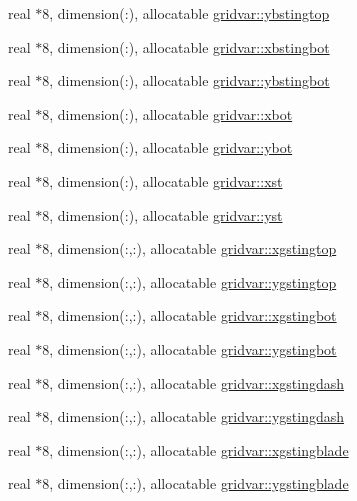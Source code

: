 \begin{DoxyCompactItemize}
\item 
real $\ast$8, dimension(\+:), allocatable \hyperlink{namespacegridvar_a0639e46ae56097b6f054ec6ec8fa5929}{gridvar\+::ybstingtop}
\item 
real $\ast$8, dimension(\+:), allocatable \hyperlink{namespacegridvar_a7b37df25204691373d89716e5f39a528}{gridvar\+::xbstingbot}
\item 
real $\ast$8, dimension(\+:), allocatable \hyperlink{namespacegridvar_a3f89618ccfbc9f5f8b2fef3e844fde54}{gridvar\+::ybstingbot}
\item 
real $\ast$8, dimension(\+:), allocatable \hyperlink{namespacegridvar_abda87534e29c12083ccea2d949c300e9}{gridvar\+::xbot}
\item 
real $\ast$8, dimension(\+:), allocatable \hyperlink{namespacegridvar_ad952a63f5ae1d8ed5480c9670ac9ecff}{gridvar\+::ybot}
\item 
real $\ast$8, dimension(\+:), allocatable \hyperlink{namespacegridvar_a2f9709ea33206d334446b47b7e2ca726}{gridvar\+::xst}
\item 
real $\ast$8, dimension(\+:), allocatable \hyperlink{namespacegridvar_addb37740c3b5b897fb0e5a34bfbcf08c}{gridvar\+::yst}
\item 
real $\ast$8, dimension(\+:,\+:), allocatable \hyperlink{namespacegridvar_a13592c5c62fa4125e18fa8df3f64a43b}{gridvar\+::xgstingtop}
\item 
real $\ast$8, dimension(\+:,\+:), allocatable \hyperlink{namespacegridvar_a7ca6b72f5d1eb6a91685b56d93b936c6}{gridvar\+::ygstingtop}
\item 
real $\ast$8, dimension(\+:,\+:), allocatable \hyperlink{namespacegridvar_a280b9f2c74950beb202cb0aae123fb8a}{gridvar\+::xgstingbot}
\item 
real $\ast$8, dimension(\+:,\+:), allocatable \hyperlink{namespacegridvar_a819dd42b0469aff2373b237be7d72b84}{gridvar\+::ygstingbot}
\item 
real $\ast$8, dimension(\+:,\+:), allocatable \hyperlink{namespacegridvar_a995496c4b06b80179c34232029a8c471}{gridvar\+::xgstingdash}
\item 
real $\ast$8, dimension(\+:,\+:), allocatable \hyperlink{namespacegridvar_a000b3ae1934c0e65a9b3c6d914ba6339}{gridvar\+::ygstingdash}
\item 
real $\ast$8, dimension(\+:,\+:), allocatable \hyperlink{namespacegridvar_adc4e81d08a89fa23d69d38d5128e0e97}{gridvar\+::xgstingblade}
\item 
real $\ast$8, dimension(\+:,\+:), allocatable \hyperlink{namespacegridvar_a11c63db6c8ecfb576129fdd9eedeb158}{gridvar\+::ygstingblade}

\end{DoxyCompactItemize}
